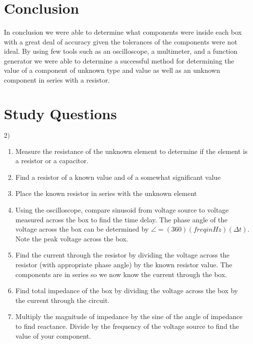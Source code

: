 \documentclass{article}
\begin{document}

\section*{Conclusion}
\paragraph{}
In conclusion we were able to determine what components were inside each box with
a great deal of accuracy given the tolerances of the components were not ideal. By
using few tools such as an oscilloscope, a multimeter, and a function generator we
were able to determine a successful method for determining the value of a component
of unknown type and value as well as an unknown component in series with a resistor.

\section*{Study Questions}

$2)$
\begin{enumerate}
\item Measure the resistance of the unknown element to determine if the element is
a resistor or a capacitor.
\item Find a resistor of a known value and of a somewhat significant value
\item Place the known resistor in series with the unknown element
\item Using the oscilloscope, compare sinusoid from voltage source to voltage measured
across the box to find the time delay. The phase angle of the voltage across the box can
be determined by $\angle{} = (360)(freq in Hz)(\Delta{} t)$. Note the peak voltage across
the box. 
\item Find the current through the resistor by dividing the voltage across the resistor
(with appropriate phase angle) by the known resistor value. The components are in series
so we now know the current through the box.
\item Find total impedance of the box by dividing the voltage across the box by the current
through the circuit.  
\item Multiply the magnitude of impedance by the sine of the angle of impedance to find 
reactance. Divide by the frequency of the voltage source to find the value of your
component. 
\end{enumerate}
\end{document}

